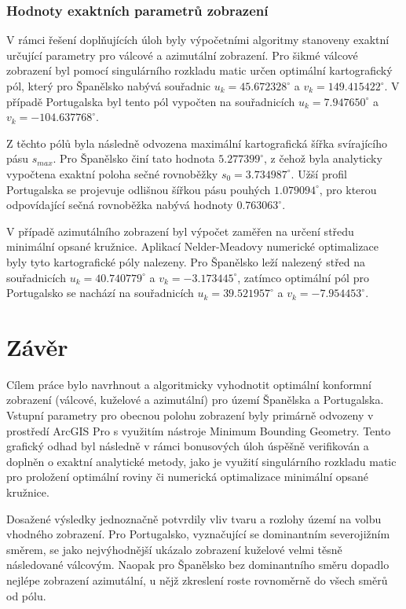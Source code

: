 \documentclass[12pt]{article}
\begin{document}
\subsubsection*{Hodnoty exaktních parametrů zobrazení}

V rámci řešení doplňujících úloh byly výpočetními algoritmy stanoveny exaktní určující parametry pro válcové a azimutální zobrazení. Pro šikmé válcové zobrazení byl pomocí singulárního rozkladu matic určen optimální kartografický pól, který pro Španělsko nabývá souřadnic $u_k = 45.672328^\circ$ a $v_k = 149.415422^\circ$. V případě Portugalska byl tento pól vypočten na souřadnicích $u_k = 7.947650^\circ$ a $v_k = -104.637768^\circ$.

Z těchto pólů byla následně odvozena maximální kartografická šířka svírajícího pásu $s_{max}$. Pro Španělsko činí tato hodnota $5.277399^\circ$, z čehož byla analyticky vypočtena exaktní poloha sečné rovnoběžky $s_0 = 3.734987^\circ$. Užší profil Portugalska se projevuje odlišnou šířkou pásu pouhých $1.079094^\circ$, pro kterou odpovídající sečná rovnoběžka nabývá hodnoty $0.763063^\circ$.

V případě azimutálního zobrazení byl výpočet zaměřen na určení středu minimální opsané kružnice. Aplikací Nelder-Meadovy numerické optimalizace byly tyto kartografické póly nalezeny. Pro Španělsko leží nalezený střed na souřadnicích $u_k = 40.740779^\circ$ a $v_k = -3.173445^\circ$, zatímco optimální pól pro Portugalsko se nachází na souřadnicích $u_k = 39.521957^\circ$ a $v_k = -7.954453^\circ$.
\clearpage
\section{Závěr}

Cílem práce bylo navrhnout a algoritmicky vyhodnotit optimální konformní zobrazení (válcové, kuželové a azimutální) pro území Španělska a Portugalska. Vstupní parametry pro obecnou polohu zobrazení byly primárně odvozeny v prostředí ArcGIS Pro s využitím nástroje Minimum Bounding Geometry. Tento grafický odhad byl následně v rámci bonusových úloh úspěšně verifikován a doplněn o exaktní analytické metody, jako je využití singulárního rozkladu matic pro proložení optimální roviny či numerická optimalizace minimální opsané kružnice.

Dosažené výsledky jednoznačně potvrdily vliv tvaru a rozlohy území na volbu vhodného zobrazení. Pro Portugalsko, vyznačující se dominantním severojižním směrem, se jako nejvýhodnější ukázalo zobrazení kuželové velmi těsně následované válcovým. Naopak pro Španělsko bez dominantního směru dopadlo nejlépe zobrazení azimutální, u nějž zkreslení roste rovnoměrně do všech směrů od pólu. 
\end{document}
